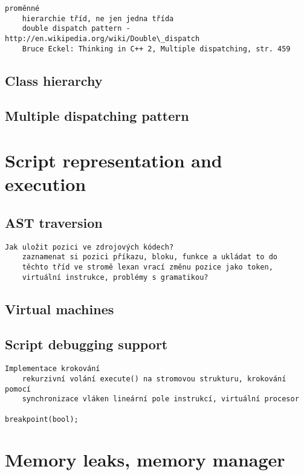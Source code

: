 \documentclass[11pt,twoside,a4paper]{book}
\begin{document}
\begin{verbatim}
proměnné
	hierarchie tříd, ne jen jedna třída
	double dispatch pattern - http://en.wikipedia.org/wiki/Double\_dispatch
	Bruce Eckel: Thinking in C++ 2, Multiple dispatching, str. 459
\end{verbatim}

\subsection{Class hierarchy}

\subsection{Multiple dispatching pattern}


\section{Script representation and execution}


\subsection{AST traversion}

\begin{verbatim}
Jak uložit pozici ve zdrojových kódech?
	zaznamenat si pozici příkazu, bloku, funkce a ukládat to do
	těchto tříd ve stromě lexan vrací změnu pozice jako token,
	virtuální instrukce, problémy s gramatikou?
\end{verbatim}


\subsection{Virtual machines}

\subsection{Script debugging support}

\begin{verbatim}
Implementace krokování
	rekurzivní volání execute() na stromovou strukturu, krokování pomocí
	synchronizace vláken lineární pole instrukcí, virtuální procesor

breakpoint(bool);
\end{verbatim}


\section{Memory leaks, memory manager}
\end{document}

